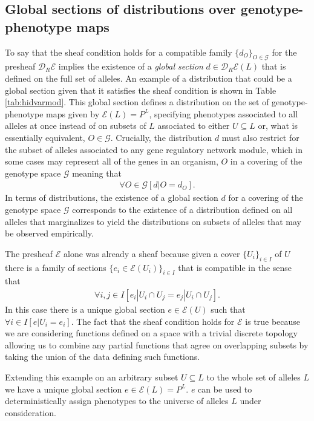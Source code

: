 \documentclass[10pt]{article}
\begin{document}
\subsection*{Global sections of distributions over genotype-phenotype maps}
To say that the sheaf condition holds for a compatible family $\{d_O\}_{O \in \mathcal{G}}$ for the presheaf $\mathcal{D}_R\mathcal{E}$ implies the existence of a \emph{global section} $d \in \mathcal{D}_R\mathcal{E}(L)$ that is defined on the full set of alleles. An example of a distribution that could be a global section given that it satisfies the sheaf condition is shown in Table \ref{tab:hidvarmod}. This global section defines a distribution on the set of genotype-phenotype maps given by $\mathcal{E}(L) = P^L$, specifying phenotypes associated to all alleles at once instead of on subsets of $L$ associated to either $U \subseteq L$ or, what is essentially equivalent, $O \in \mathcal{G}$. Crucially, the distribution $d$ must also restrict for the subset of alleles associated to any gene regulatory network module, which in some cases may represent all of the genes in an organism, $O$ in a covering of the genotype space $\mathcal{G}$ meaning that
\begin{eqnarray}
\forall O \in \mathcal{G} \left[ d|O = d_O \right].
\end{eqnarray}
In terms of distributions, the existence of a global section $d$ for a covering of the genotype space $\mathcal{G}$ corresponds to the existence of a distribution defined on all alleles that marginalizes to yield the distributions on subsets of alleles that may be observed empirically.

The presheaf $\mathcal{E}$ alone was already a sheaf because given a cover $\{U_i\}_{i \in I}$ of $U$ there is a family of sections $\{e_i \in \mathcal{E}(U_i)\}_{i \in I}$ that is compatible in the sense that
\begin{eqnarray}
\forall i,j \in I \left[ e_i|U_i \cap U_j = e_j|U_i \cap U_j \right].
\end{eqnarray}
In this case there is a unique global section $e \in \mathcal{E}(U)$ such that $\forall i \in I \left[ e|U_i = e_i \right]$. The fact that the sheaf condition holds for $\mathcal{E}$ is true because we are considering functions defined on a space with a trivial discrete topology allowing us to combine any partial functions that agree on overlapping subsets by taking the union of the data defining such functions. 

Extending this example on an arbitrary subset $U \subseteq L$ to the whole set of alleles $L$ we have a unique global section $e \in \mathcal{E}(L) = P^L$. $e$ can be used to deterministically assign phenotypes to the universe of alleles $L$ under consideration.
\end{document}
